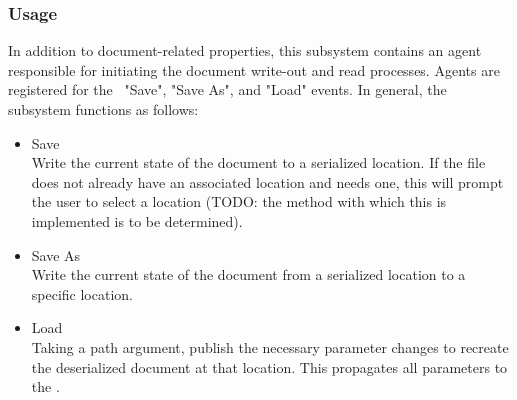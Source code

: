 \subsubsection{Usage}
In addition to document-related properties, this subsystem contains an agent responsible for initiating the document write-out and read processes.
Agents are registered for the \uimod\ "Save", "Save As", and "Load" events.
In general, the subsystem functions as follows:
\begin{itemize}
      \item Save \\
            Write the current state of the document to a serialized location.
            If the file does not already have an associated location and needs one, this will prompt the user to select a location (TODO: the method with which this is implemented is to be determined).
      \item Save As \\
            Write the current state of the document from a serialized location to a specific location.
      \item Load \\
            Taking a path argument, publish the necessary parameter changes to recreate the deserialized document at that location.
            This propagates all parameters to the \docftype.
\end{itemize}